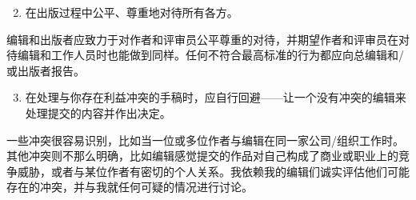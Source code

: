 \begin{enumerate}
  \setcounter{enumi}{1}
\item 在出版过程中公平、尊重地对待所有各方。
\end{enumerate}

编辑和出版者应致力于对作者和评审员公平尊重的对待，并期望作者和评审员在对待编辑和工作人员时也能做到同样。任何不符合最高标准的行为都应向总编辑和/或出版者报告。

\begin{enumerate}
  \setcounter{enumi}{2}
\item 在处理与你存在利益冲突的手稿时，应自行回避——让一个没有冲突的编辑来处理提交的内容并作出决定。
\end{enumerate}

一些冲突很容易识别，比如当一位或多位作者与编辑在同一家公司/组织工作时。其他冲突则不那么明确，比如编辑感觉提交的作品对自己构成了商业或职业上的竞争威胁，或者与某位作者有密切的个人关系。我依赖我的编辑们诚实评估他们可能存在的冲突，并与我就任何可疑的情况进行讨论。

